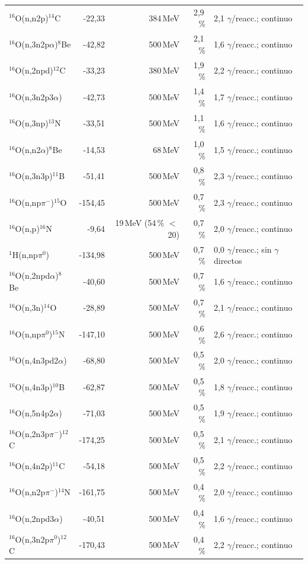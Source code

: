 \documentclass[11pt,a4paper]{article}
\begin{document}
{\begin{longtable}{p{4.4cm}rrrp{4.6cm}}
$^{16}$O(n,n2p)$^{14}$C & -22,33 & 384\,MeV & 2,9\,\% & 2,1 $\gamma$/reacc.; continuo \\
$^{16}$O(n,3n2p$\alpha$)$^{8}$Be & -42,82 & 500\,MeV & 2,1\,\% & 1,6 $\gamma$/reacc.; continuo \\
$^{16}$O(n,2npd)$^{12}$C & -33,23 & 380\,MeV & 1,9\,\% & 2,2 $\gamma$/reacc.; continuo \\
$^{16}$O(n,3n2p3$\alpha$) & -42,73 & 500\,MeV & 1,4\,\% & 1,7 $\gamma$/reacc.; continuo \\
$^{16}$O(n,3np)$^{13}$N & -33,51 & 500\,MeV & 1,1\,\% & 1,6 $\gamma$/reacc.; continuo \\
$^{16}$O(n,n2$\alpha$)$^{8}$Be & -14,53 & 68\,MeV & 1,0\,\% & 1,5 $\gamma$/reacc.; continuo \\
$^{16}$O(n,3n3p)$^{11}$B & -51,41 & 500\,MeV & 0,8\,\% & 2,3 $\gamma$/reacc.; continuo \\
$^{16}$O(n,np$\pi^-$)$^{15}$O & -154,45 & 500\,MeV & 0,7\,\% & 2,3 $\gamma$/reacc.; continuo \\
$^{16}$O(n,p)$^{16}$N & -9,64 & 19\,MeV (54\,\% $<$\,20) & 0,7\,\% & 2,0 $\gamma$/reacc.; continuo \\
$^{1}$H(n,np$\pi^0$) & -134,98 & 500\,MeV & 0,7\,\% & 0,0 $\gamma$/reacc.; sin $\gamma$ directos \\
$^{16}$O(n,2npd$\alpha$)$^{8}$Be & -40,60 & 500\,MeV & 0,7\,\% & 1,6 $\gamma$/reacc.; continuo \\
$^{16}$O(n,3n)$^{14}$O & -28,89 & 500\,MeV & 0,7\,\% & 2,1 $\gamma$/reacc.; continuo \\
$^{16}$O(n,np$\pi^0$)$^{15}$N & -147,10 & 500\,MeV & 0,6\,\% & 2,6 $\gamma$/reacc.; continuo \\
$^{16}$O(n,4n3pd2$\alpha$) & -68,80 & 500\,MeV & 0,5\,\% & 2,0 $\gamma$/reacc.; continuo \\
$^{16}$O(n,4n3p)$^{10}$B & -62,87 & 500\,MeV & 0,5\,\% & 1,8 $\gamma$/reacc.; continuo \\
$^{16}$O(n,5n4p2$\alpha$) & -71,03 & 500\,MeV & 0,5\,\% & 1,9 $\gamma$/reacc.; continuo \\
$^{16}$O(n,2n3p$\pi^-$)$^{12}$C & -174,25 & 500\,MeV & 0,5\,\% & 2,1 $\gamma$/reacc.; continuo \\
$^{16}$O(n,4n2p)$^{11}$C & -54,18 & 500\,MeV & 0,5\,\% & 2,2 $\gamma$/reacc.; continuo \\
$^{16}$O(n,n2p$\pi^-$)$^{14}$N & -161,75 & 500\,MeV & 0,4\,\% & 2,0 $\gamma$/reacc.; continuo \\
$^{16}$O(n,2npd3$\alpha$) & -40,51 & 500\,MeV & 0,4\,\% & 1,6 $\gamma$/reacc.; continuo \\
$^{16}$O(n,3n2p$\pi^0$)$^{12}$C & -170,43 & 500\,MeV & 0,4\,\% & 2,2 $\gamma$/reacc.; continuo \\
\bottomrule\end{longtable}}
\end{document}
